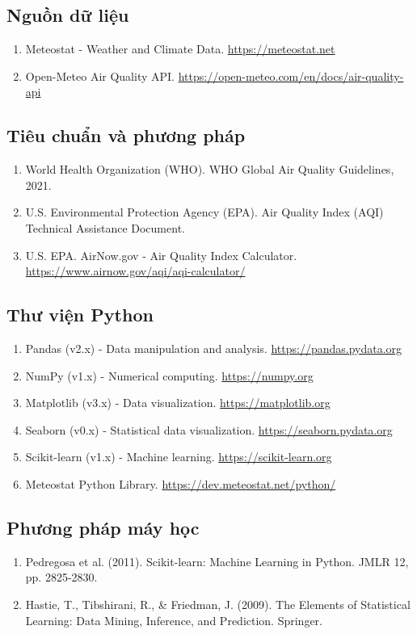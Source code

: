 \documentclass[12pt,a4paper]{article}
\begin{document}
\subsection{Nguồn dữ liệu}
\begin{enumerate}
    \item Meteostat - Weather and Climate Data. \url{https://meteostat.net}
    \item Open-Meteo Air Quality API. \url{https://open-meteo.com/en/docs/air-quality-api}
\end{enumerate}

\subsection{Tiêu chuẩn và phương pháp}
\begin{enumerate}
    \item World Health Organization (WHO). WHO Global Air Quality Guidelines, 2021.
    \item U.S. Environmental Protection Agency (EPA). Air Quality Index (AQI) Technical Assistance Document.
    \item U.S. EPA. AirNow.gov - Air Quality Index Calculator. \url{https://www.airnow.gov/aqi/aqi-calculator/}
\end{enumerate}

\subsection{Thư viện Python}
\begin{enumerate}
    \item Pandas (v2.x) - Data manipulation and analysis. \url{https://pandas.pydata.org}
    \item NumPy (v1.x) - Numerical computing. \url{https://numpy.org}
    \item Matplotlib (v3.x) - Data visualization. \url{https://matplotlib.org}
    \item Seaborn (v0.x) - Statistical data visualization. \url{https://seaborn.pydata.org}
    \item Scikit-learn (v1.x) - Machine learning. \url{https://scikit-learn.org}
    \item Meteostat Python Library. \url{https://dev.meteostat.net/python/}
\end{enumerate}

\subsection{Phương pháp máy học}
\begin{enumerate}
    \item Pedregosa et al. (2011). Scikit-learn: Machine Learning in Python. JMLR 12, pp. 2825-2830.
    \item Hastie, T., Tibshirani, R., \& Friedman, J. (2009). The Elements of Statistical Learning: Data Mining, Inference, and Prediction. Springer.
\end{enumerate}
\end{document}
